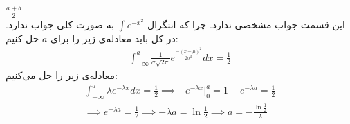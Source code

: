 \\
 $\frac{a + b}{2}$\\
 این قسمت جواب مشخصی ندارد.
چرا که انتگرال
$\int e ^ {-x^2}$
به صورت کلی جواب ندارد. در کل باید معادله‌ی زیر را برای $a$ حل کنیم:
\begin{gather*}
    \int_{-\infty}^{a} \frac{1}{\sigma \sqrt{2\pi}} e^{\frac{-(x - \mu)^2}{2\sigma^2}} dx = \frac{1}{2}
\end{gather*}
 معادله‌ی زیر را حل می‌کنیم:
\begin{gather*}
    \int_{-\infty}^{a} \lambda e^{-\lambda x} dx = \frac{1}{2}
    \implies -e^{-\lambda x} \big |_{0}^{a} = 1 - e^{-\lambda a} = \frac{1}{2}\\
    \implies e^{-\lambda a} = \frac{1}{2} \implies -\lambda a = \ln \frac{1}{2} \implies a = -\frac{\ln \frac{1}{2}}{\lambda}
\end{gather*}
